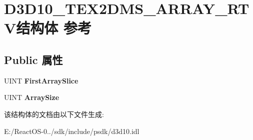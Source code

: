 \hypertarget{struct_d3_d10___t_e_x2_d_m_s___a_r_r_a_y___r_t_v}{}\section{D3\+D10\+\_\+\+T\+E\+X2\+D\+M\+S\+\_\+\+A\+R\+R\+A\+Y\+\_\+\+R\+T\+V结构体 参考}
\label{struct_d3_d10___t_e_x2_d_m_s___a_r_r_a_y___r_t_v}
\subsection*{Public 属性}
\begin{DoxyCompactItemize}
\item 
\mbox{\label{struct_d3_d10___t_e_x2_d_m_s___a_r_r_a_y___r_t_v_a41bedfdbf051af4aab9745ad45acc562}} 
U\+I\+NT {\bfseries First\+Array\+Slice}
\item 
\mbox{\label{struct_d3_d10___t_e_x2_d_m_s___a_r_r_a_y___r_t_v_ad320dbe8f6072b57aa75a506fd87edff}} 
U\+I\+NT {\bfseries Array\+Size}
\end{DoxyCompactItemize}


该结构体的文档由以下文件生成\+:\begin{DoxyCompactItemize}
\item 
E\+:/\+React\+O\+S-\/0../sdk/include/psdk/d3d10.\+idl\end{DoxyCompactItemize}
